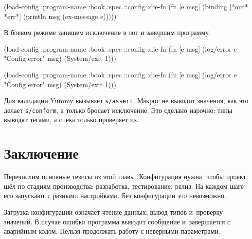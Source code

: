 \else

\begin{english}
  \begin{clojure}
(load-config
 {:program-name :book
  :spec ::config
  :die-fn (fn [e msg]
            (binding [*out* *err*]
              (println msg (ex-message e))))})
  \end{clojure}
\end{english}

\fi

\noindent
В боевом режиме запишем исключение в лог и завершим программу.


\ifx\devicetype\mobile

\begin{english}
  \begin{clojure}
(load-config
 {:program-name :book
  :spec ::config
  :die-fn (fn [e msg]
            (log/error e
              "Config error" msg)
            (System/exit 1))})
  \end{clojure}
\end{english}

\else

\begin{english}
  \begin{clojure}
(load-config
 {:program-name :book
  :spec ::config
  :die-fn (fn [e msg]
            (log/error e "Config error" msg)
            (System/exit 1))})
  \end{clojure}
\end{english}

\fi

Для валидации Yummy вызывает \verb|s/assert|. Макрос не выводит значения, как
это делает \verb|s/conform|, а только бросает исключение. Это сделано нарочно:
типы выводят тегами, а спека только проверяет их.

\section{Заключение}

Перечислим основные тезисы из этой главы. Конфигурация нужна, чтобы проект шёл
по стадиям производства: разработка, тестирование, релиз. На каждом шаге его
запускают с разными настройками. Без конфигурации это невозможно.

Загрузка конфигурации означает чтение данных, вывод типов и~проверку значений. В
случае ошибки программа выводит сообщение и~завершается с аварийным
кодом. Нельзя продолжать работу с неверными параметрами.

